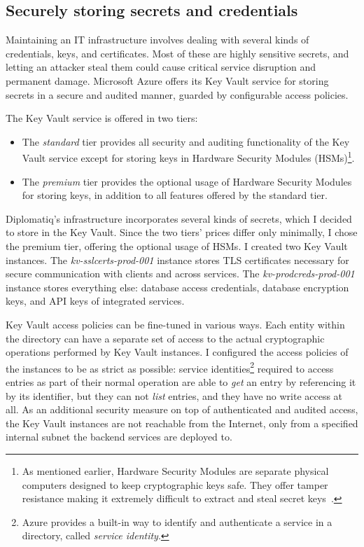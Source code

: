 \subsection{Securely storing secrets and credentials}

Maintaining an IT infrastructure involves dealing with several kinds of credentials, keys, and certificates. Most of these are highly sensitive secrets, and letting an attacker steal them could cause critical service disruption and permanent damage. Microsoft Azure offers its Key Vault service for storing secrets in a secure and audited manner, guarded by configurable access policies.

The Key Vault service is offered in two tiers:

\begin{itemize}
\item The \emph{standard} tier provides all security and auditing functionality of the Key Vault service except for storing keys in Hardware Security Modules (HSMs)\footnote{As mentioned earlier, Hardware Security Modules are separate physical computers designed to keep cryptographic keys safe. They offer tamper resistance making it extremely difficult to extract and steal secret keys~\cite{fips-140-3}.}.
\item The \emph{premium} tier provides the optional usage of Hardware Security Modules for storing keys, in addition to all features offered by the standard tier.
\end{itemize}

Diplomatiq's infrastructure incorporates several kinds of secrets, which I decided to store in the Key Vault. Since the two tiers' prices differ only minimally, I chose the premium tier, offering the optional usage of HSMs. I created two Key Vault instances. The \emph{kv-sslcerts-prod-001} instance stores TLS certificates necessary for secure communication with clients and across services. The \emph{kv-prodcreds-prod-001} instance stores everything else: database access credentials, database encryption keys, and API keys of integrated services.

Key Vault access policies can be fine-tuned in various ways. Each entity within the directory can have a separate set of access to the actual cryptographic operations performed by Key Vault instances. I configured the access policies of the instances to be as strict as possible: service identities\footnote{Azure provides a built-in way to identify and authenticate a service in a directory, called \emph{service identity}.} required to access entries as part of their normal operation are able to \emph{get} an entry by referencing it by its identifier, but they can not \emph{list} entries, and they have no write access at all. As an additional security measure on top of authenticated and audited access, the Key Vault instances are not reachable from the Internet, only from a specified internal subnet the backend services are deployed to.


